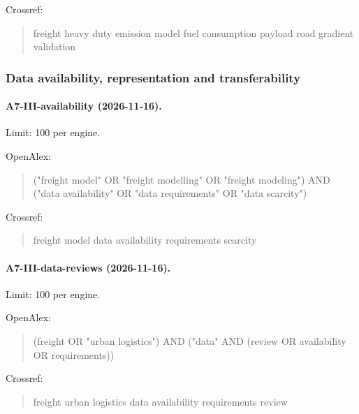 \noindent Crossref:

\begin{quote}\footnotesize\ttfamily\raggedright

freight heavy duty emission model fuel consumption payload road gradient validation

\end{quote}

\subsubsection{Data availability, representation and transferability}

\paragraph{A7-III-availability (2026-11-16).} Limit: 100 per engine.

\noindent OpenAlex:

\begin{quote}\footnotesize\ttfamily\raggedright

("freight model" OR "freight modelling" OR "freight modeling") AND ("data availability" OR "data requirements" OR "data scarcity")

\end{quote}

\noindent Crossref:

\begin{quote}\footnotesize\ttfamily\raggedright

freight model data availability requirements scarcity

\end{quote}

\paragraph{A7-III-data-reviews (2026-11-16).} Limit: 100 per engine.

\noindent OpenAlex:

\begin{quote}\footnotesize\ttfamily\raggedright

(freight OR "urban logistics") AND ("data" AND (review OR availability OR requirements))

\end{quote}

\noindent Crossref:

\begin{quote}\footnotesize\ttfamily\raggedright

freight urban logistics data availability requirements review

\end{quote}

